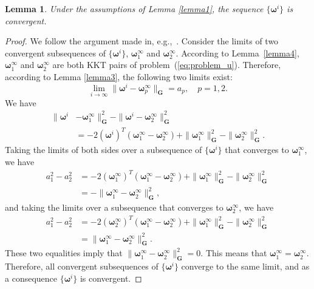 \documentclass[10pt,twocolumn,twoside]{IEEEtran}
\newcommand{\G}{\mathbf{G}} %
\newtheorem{lemma}{Lemma}
\begin{document}
\begin{lemma} \label{lemma5}
	Under the assumptions of Lemma \ref{lemma1}, the sequence $\{ \bm{\omega}^i \}$ is convergent.
\end{lemma}

\begin{proof}
	We follow the argument made in, e.g.,~\cite{Rockafellar1976, Chen1994}. Consider the limits of two convergent subsequences of $\{\bm{\omega}^i\}$, $\bm{\omega}^{\infty}_1$ and $\bm{\omega}^{\infty}_2$. According to Lemma~\ref{lemma4}, $\bm{\omega}^{\infty}_1$ and $\bm{\omega}^{\infty}_2$ are both KKT pairs of problem~(\ref{eq:problem_u}). Therefore, according to Lemma \ref{lemma3}, the following two limits exist:
	\begin{equation}
	\lim_{i \to \infty} \| \bm{\omega}^i - \bm{\omega}^{\infty}_p \|_{\G} = a_p, \quad p = 1,2.
	\end{equation}
	We have
	\begin{align*}
	\| \bm{\omega}^i& - \bm{\omega}^{\infty}_1 \|^2_{\G} - \| \bm{\omega}^i - \bm{\omega}^{\infty}_2 \|^2_{\G} \\
	& = -2 (\bm{\omega}^i)^T(\bm{\omega}^{\infty}_1 - \bm{\omega}^{\infty}_2) + \| \bm{\omega}^{\infty}_1 \|^2_{\G}  - \| \bm{\omega}^{\infty}_2 \|^2_{\G}.
	\end{align*}
	Taking the limits of both sides over a subsequence of $\{\bm{\omega}^i\}$ that converges to $\bm{\omega}^{\infty}_1$, we have 
	\begin{align*}
	a_1^2 - a_2^2 & = -2 (\bm{\omega}^{\infty}_1)^T(\bm{\omega}^{\infty}_1 - \bm{\omega}^{\infty}_2) + \| \bm{\omega}^{\infty}_1 \|^2_{\G}  - \| \bm{\omega}^{\infty}_2 \|^2_{\G} \\
	& = - \| \bm{\omega}^{\infty}_1 - \bm{\omega}^{\infty}_2 \|^2_{\G},
	\end{align*}
	and taking the limits over a subsequence that converges to $\bm{\omega}^{\infty}_2$, we have
	\begin{align*}
	a_1^2 - a_2^2 & = -2 (\bm{\omega}^{\infty}_2)^T(\bm{\omega}^{\infty}_1 - \bm{\omega}^{\infty}_2) + \| \bm{\omega}^{\infty}_1 \|^2_{\G}  - \| \bm{\omega}^{\infty}_2 \|^2_{\G} \\
	& = \| \bm{\omega}^{\infty}_1 - \bm{\omega}^{\infty}_2 \|^2_{\G}.
	\end{align*}
	These two equalities imply that $\| \bm{\omega}^{\infty}_1 - \bm{\omega}^{\infty}_2 \|^2_{\G} = 0$. This means that $\bm{\omega}^{\infty}_1=\bm{\omega}^{\infty}_2$. Therefore, all convergent subsequences of $\{\bm{\omega}^i\}$ converge to the same limit, and as a consequence $\{\bm{\omega}^i\}$ is convergent.
\end{proof}
\end{document}
